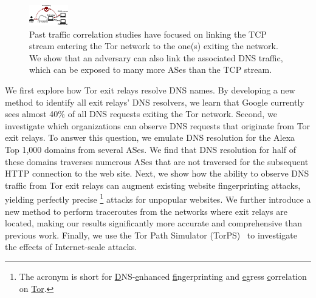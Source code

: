 \begin{figure}[t]
	\centering
	\includegraphics[width=0.65\linewidth]{figures/attack-concept.pdf}
	\caption{Past traffic correlation studies have focused on linking the TCP
		stream entering the Tor network to the one(s) exiting the network.  We
		show that an adversary can also link the associated DNS traffic, which
		can be exposed to many more ASes than the TCP stream.}
	\label{fig:overview}
\end{figure}

We first explore how Tor exit relays resolve DNS names.  By developing a new
method to identify all exit relays' DNS resolvers, we learn that Google
currently sees almost 40\% of all DNS requests exiting the Tor network.  Second,
we investigate which organizations can observe DNS requests that originate from
Tor exit relays.  To answer this question, we emulate DNS resolution for the
Alexa Top 1,000 domains from several ASes.
We find that DNS resolution for half of these domains traverses numerous
ASes that are not traversed for the subsequent HTTP connection to the web site.  
Next, we show how the ability to observe DNS 
traffic from Tor exit relays can augment existing website fingerprinting
attacks, yielding perfectly precise \name\footnote{The acronym is short for
\underline{D}NS-\underline{e}nhanced \underline{f}ingerprinting and
\underline{e}gress \underline{c}orrelation on \underline{Tor}.} attacks for
unpopular websites.  
We further introduce a new method to perform traceroutes from the networks where
exit relays are located, making our results significantly more accurate and
comprehensive than previous work.  
Finally, we use the Tor Path Simulator (TorPS)~\cite{TorPS} 
to investigate the effects of Internet-scale \name attacks. 

